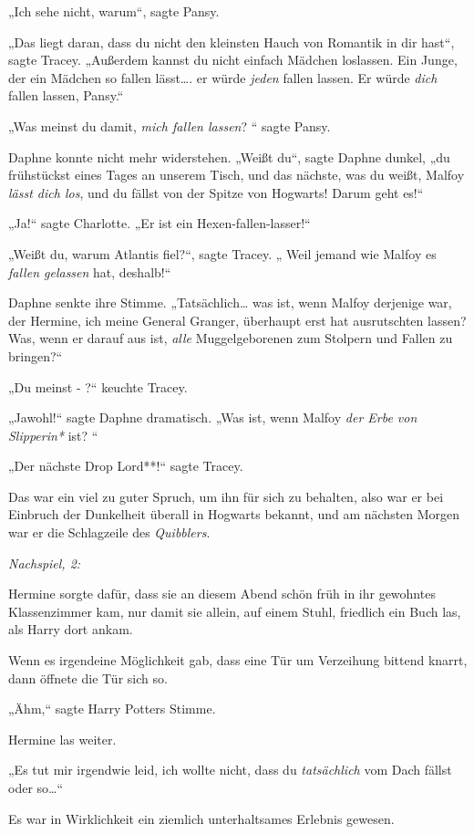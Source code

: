 {„Ich sehe nicht, warum“, sagte Pansy.

„Das liegt daran, dass du nicht den kleinsten Hauch von Romantik in dir hast“, sagte Tracey. „Außerdem kannst du nicht einfach Mädchen loslassen. Ein Junge, der ein Mädchen so fallen lässt…. er würde \emph{jeden} fallen lassen. Er würde \emph{dich} fallen lassen, Pansy.“

„Was meinst du damit, \emph{mich fallen lassen}? “ sagte Pansy.

Daphne konnte nicht mehr widerstehen. „Weißt du“, sagte Daphne dunkel, „du frühstückst eines Tages an unserem Tisch, und das nächste, was du weißt, Malfoy \emph{lässt dich los}, und du fällst von der Spitze von Hogwarts! Darum geht es!“

„Ja!“ sagte Charlotte. „Er ist ein Hexen-fallen-lasser!“

„Weißt du, warum Atlantis fiel?“, sagte Tracey. „ Weil jemand wie Malfoy es \emph{fallen gelassen} hat, deshalb!“

Daphne senkte ihre Stimme. „Tatsächlich… was ist, wenn Malfoy derjenige war, der Hermine, ich meine General Granger, überhaupt erst hat ausrutschten lassen? Was, wenn er darauf aus ist, \emph{alle} Muggelgeborenen zum Stolpern und Fallen zu bringen?“

„Du meinst - ?“ keuchte Tracey.

„Jawohl!“ sagte Daphne dramatisch. „Was ist, wenn Malfoy \emph{der Erbe von} \emph{Slipperin*} ist? “

„Der nächste Drop Lord**!“ sagte Tracey.

Das war ein viel zu guter Spruch, um ihn für sich zu behalten, also war er bei Einbruch der Dunkelheit überall in Hogwarts bekannt, und am nächsten Morgen war er die Schlagzeile des \emph{Quibblers}.

\emph{Nachspiel, 2:}

Hermine sorgte dafür, dass sie an diesem Abend schön früh in ihr gewohntes Klassenzimmer kam, nur damit sie allein, auf einem Stuhl, friedlich ein Buch las, als Harry dort ankam.

Wenn es irgendeine Möglichkeit gab, dass eine Tür um Verzeihung bittend knarrt, dann öffnete die Tür sich so.

„Ähm,“ sagte Harry Potters Stimme.

Hermine las weiter.

„Es tut mir irgendwie leid, ich wollte nicht, dass du \emph{tatsächlich} vom Dach fällst oder so…“

Es war in Wirklichkeit ein ziemlich unterhaltsames Erlebnis gewesen.

}
